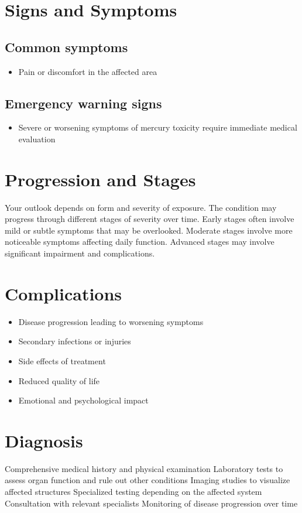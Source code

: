 \section{Signs and Symptoms}

\subsection{Common symptoms}
\begin{itemize}[noitemsep]
  \item Pain or discomfort in the affected area
  \end{itemize}

\subsection{Emergency warning signs}
\begin{itemize}[noitemsep]
  \item Severe or worsening symptoms of mercury toxicity require immediate medical evaluation
\end{itemize}
\section{Progression and Stages}
Your outlook depends on form and severity of exposure. The condition may progress through different stages of severity over time. Early stages often involve mild or subtle symptoms that may be overlooked. Moderate stages involve more noticeable symptoms affecting daily function. Advanced stages may involve significant impairment and complications.
\section{Complications}
\begin{itemize}[noitemsep]
  \item Disease progression leading to worsening symptoms
  \item Secondary infections or injuries
  \item Side effects of treatment
  \item Reduced quality of life
  \item Emotional and psychological impact
\end{itemize}
\section{Diagnosis}
Comprehensive medical history and physical examination Laboratory tests to assess organ function and rule out other conditions Imaging studies to visualize affected structures Specialized testing depending on the affected system Consultation with relevant specialists Monitoring of disease progression over time

